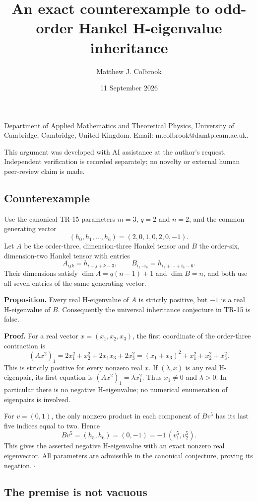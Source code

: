 \documentclass[
  11pt,
]{article}
\title{An exact counterexample to odd-order Hankel H-eigenvalue
inheritance}
\author{Matthew J. Colbrook}
\date{11 September 2026}
\begin{document}
\maketitle

Department of Applied Mathematics and Theoretical Physics, University of
Cambridge, Cambridge, United Kingdom. Email: m.colbrook@damtp.cam.ac.uk.

This argument was developed with AI assistance at the author's request.
Independent verification is recorded separately; no novelty or external
human peer-review claim is made.

\subsection{Counterexample}\label{counterexample}

Use the canonical TR-15 parameters \(m=3\), \(q=2\) and \(n=2\), and the
common generating vector \[
(h_0,h_1,\ldots,h_6)=(2,0,1,0,2,0,-1).
\] Let \(A\) be the order-three, dimension-three Hankel tensor and \(B\)
the order-six, dimension-two Hankel tensor with entries \[
A_{ijk}=h_{i+j+k-3},\qquad
B_{i_1\cdots i_6}=h_{i_1+\cdots+i_6-6}.
\] Their dimensions satisfy \(\dim A=q(n-1)+1\) and \(\dim B=n\), and
both use all seven entries of the same generating vector.

\textbf{Proposition.} Every real H-eigenvalue of \(A\) is strictly
positive, but \(-1\) is a real H-eigenvalue of \(B\). Consequently the
universal inheritance conjecture in TR-15 is false.

\textbf{Proof.} For a real vector \(x=(x_1,x_2,x_3)\), the first
coordinate of the order-three contraction is \[
(Ax^2)_1=2x_1^2+x_2^2+2x_1x_3+2x_3^2
=(x_1+x_3)^2+x_1^2+x_2^2+x_3^2.
\] This is strictly positive for every nonzero real \(x\). If
\((\lambda,x)\) is any real H-eigenpair, its first equation is
\((Ax^2)_1=\lambda x_1^2\). Thus \(x_1\ne0\) and \(\lambda>0\). In
particular there is no negative H-eigenvalue; no numerical enumeration
of eigenpairs is involved.

For \(v=(0,1)\), the only nonzero product in each component of \(Bv^5\)
has its last five indices equal to two. Hence \[
Bv^5=(h_5,h_6)=(0,-1)=-1\,(v_1^5,v_2^5).
\] This gives the asserted negative H-eigenvalue with an exact nonzero
real eigenvector. All parameters are admissible in the canonical
conjecture, proving its negation. \(\square\)

\subsection{The premise is not
vacuous}\label{the-premise-is-not-vacuous}
\end{document}
